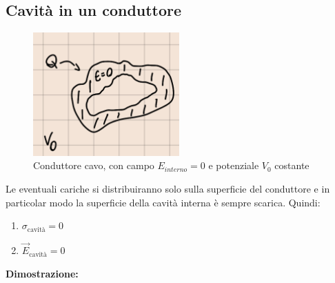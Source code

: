\documentclass[a4paper, 12pt]{book}
\theoremstyle{plain}
\begin{document}
\subsection{Cavità in un conduttore}

\begin{figure}
    \includegraphics[width=0.5\textwidth]{conduttore_cavo.png}
    \caption[]{Conduttore cavo, con campo $E_{interno} = 0$ e potenziale $V_0$ costante}
\end{figure}

Le eventuali cariche si distribuiranno solo sulla superficie del conduttore e in particolar modo la superficie della cavità interna è sempre scarica.
Quindi:

\begin{enumerate}
    \item $\sigma_{\textrm{cavità}} = 0$
    \item $\vec{E}_{\textrm{cavità}} = 0$
\end{enumerate}

\textbf{Dimostrazione:}
\end{document}
